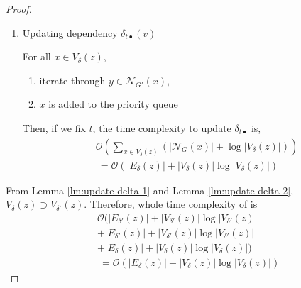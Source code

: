\documentclass[twocolumn]{article}
\begin{document}
\begin{proof}
\begin{enumerate}[label=(\alph*)]
    \item Updating dependency $\delta_{t\bullet}(v)$
      \par For all $x\in V_\delta(z)$,
      \begin{enumerate}[label=\arabic*.]
      \item iterate through $y\in\mathcal{N}_{G'}(x)$,
      \item $x$ is added to the priority queue
      \end{enumerate}
      Then, if we fix $t$, the time complexity to update $\delta_{t\bullet}$ is,
      \begin{equation}
        \begin{aligned}
          &\mathcal{O}(\sum_{x\in V_\delta(z)}(\lvert\mathcal{N}_G(x)\rvert
          +\log\lvert V_\delta(z)\rvert)) \nonumber\\
          &\:=\mathcal{O}(\lvert E_\delta(z)\rvert
          +\lvert V_\delta(z)\rvert\log\lvert V_\delta(z)\rvert) \nonumber
        \end{aligned}
      \end{equation}
    \end{enumerate}

    From Lemma \ref{lm:update-delta-1} and Lemma \ref{lm:update-delta-2}, $V_\delta(z)\supset V_{\delta'}(z)$.
    Therefore, whole time complexity of  is
    \begin{equation*}
      \begin{aligned}
        &\mathcal{O}(
        \lvert E_{\delta'}(z)\rvert+\lvert V_{\delta'}(z)\rvert\log\lvert V_{\delta'}(z)\rvert\\
        &+\lvert E_{\delta'}(z)\rvert+\lvert V_{\delta'}(z)\rvert\log\lvert V_{\delta'}(z)\rvert\\
        &+\lvert E_\delta(z)\rvert+\lvert V_\delta(z)\rvert\log\lvert V_\delta(z)\rvert
        ) \nonumber\\
        &\:=\mathcal{O}(\lvert E_\delta(z)\rvert+\lvert V_\delta(z)\rvert\log\lvert V_\delta(z)\rvert)
      \end{aligned}
    \end{equation*}


\end{proof}
\end{document}
